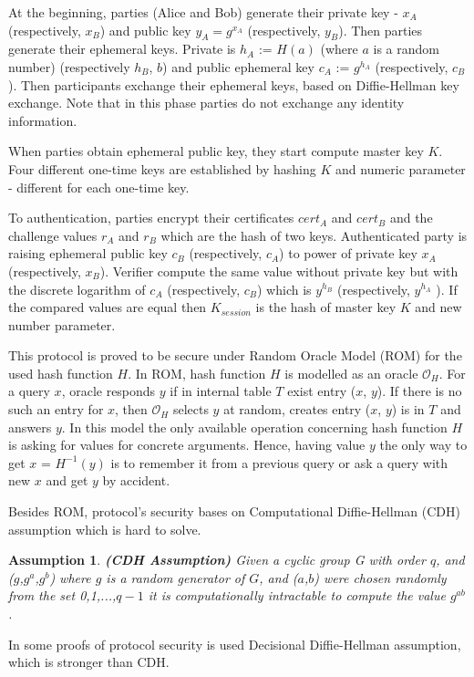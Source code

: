 \documentclass[11pt,titlepage]{article}
\theoremstyle{plain}
\newtheorem{assumption}{Assumption}
\begin{document}
At the beginning, parties (Alice and Bob) generate their private key - $x_A$ (respectively, $x_B$) and public key $y_A = g^{x_A}$ (respectively, $y_B$). Then parties generate their ephemeral keys. Private is $h_A$ := $H(a)$ (where $a$ is a random number) (respectively $h_B$, $b$) and public ephemeral key $c_A$ := $g^{h_A}$ (respectively, $c_B$). Then participants exchange their ephemeral keys, based on Diffie-Hellman key exchange. Note that in this phase parties do not exchange any identity information.

\vspace{5mm}

When parties obtain ephemeral public key, they start compute master
key $K$. Four different one-time keys are established by hashing $K$ and numeric parameter - different for each one-time key.

\vspace{5mm}

To authentication, parties encrypt their certificates $cert_A$ and $cert_B$ and the challenge values $r_A$ and $r_B$ which are the hash of two keys. Authenticated party is raising ephemeral public key $c_B$ (respectively, $c_A$) to power of private key $x_A$ (respectively, $x_B$). Verifier compute the same value without private key but with the discrete logarithm of $c_A$ (respectively, $c_B$) which is $y^{h_B}$ (respectively, $y^{h_A}$ ). If the compared values are equal then $K_{session}$ is the hash of master key $K$ and new number parameter.

\vspace{5mm}

This protocol is proved to be secure under Random Oracle Model (ROM) for the used
hash function $H$. In ROM, hash function $H$ is modelled as an oracle $\mathcal{O}_H$. For a query $x$, oracle responds $y$ if in internal table $T$ exist entry ($x$, $y$). If there is no such an entry for $x$, then $\mathcal{O}_H$ selects $y$ at random, creates entry ($x$, $y$) is in $T$ and answers $y$. In this model the only available operation concerning hash function $H$ is asking for values for concrete arguments. Hence, having value $y$ the only way to get $x$ = $H^{-1}(y)$ is to remember it from a previous query or ask a query with new $x$ and get $y$ by accident. 

\vspace{5mm}

Besides ROM, protocol's security bases on Computational Diffie-Hellman (CDH) assumption which is hard to solve.
\begin{assumption}
	\textbf{(CDH Assumption)} 
	Given a cyclic group G with order $q$, and ($g$,$g^a$,$g^b$) where $g$ is a random generator of $G$, and ($a$,$b$) were chosen randomly from the set {0,1,...,$q-1$} it is computationally intractable to compute the value $g^{ab}$.
\end{assumption}
In some proofs of protocol security is used Decisional Diffie-Hellman assumption, which is stronger than CDH.
\end{document}
